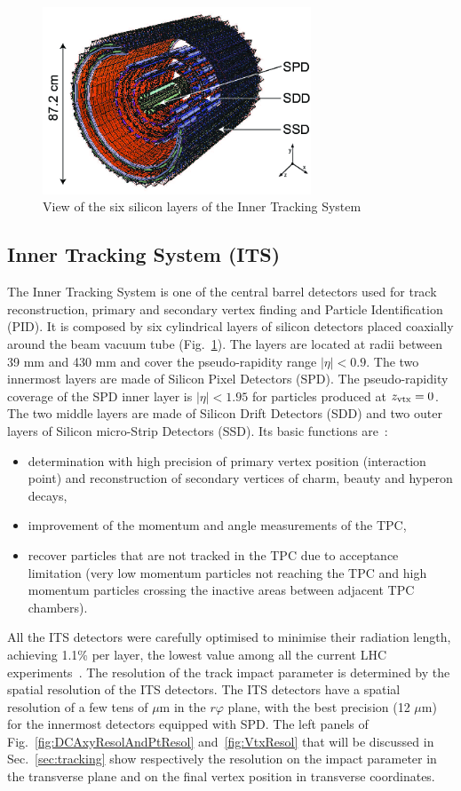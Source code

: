 \begin{figure}[!t]
\centering
\includegraphics[width=8cm]{FigCap3/figures_its-rf-2.png}
\caption{View of the six silicon layers of the Inner Tracking System}
\label{fig:image2}
\end{figure}

\subsection{Inner Tracking System (ITS)}
The Inner Tracking System is one of the central barrel detectors used for track 
reconstruction, primary and secondary vertex finding and Particle Identification (PID).
It is composed by six cylindrical layers of silicon detectors placed 
coaxially around the beam vacuum tube (Fig.~\ref{fig:image2}). The layers are located 
at radii between 39 mm and 430 mm and cover the pseudo-rapidity range 
$|\eta|<0.9$. The two innermost layers are made of Silicon Pixel Detectors (SPD). 
The pseudo-rapidity coverage of the SPD inner layer is $|\eta|<1.95$ for particles produced at $z_{\rm vtx}=0$. 
The two middle layers are made of Silicon Drift Detectors (SDD) 
and two outer layers of Silicon micro-Strip Detectors (SSD).
Its basic functions are~\cite{ITS-TDR}:
\begin{itemize}
\item determination with high precision of primary vertex position (interaction point) and reconstruction of secondary vertices 
of charm, beauty and hyperon decays,
\item improvement of the momentum and angle measurements of the TPC,
\item recover particles that are not tracked in the TPC due to acceptance limitation (very low momentum particles
not reaching the TPC and high momentum particles crossing the inactive areas between adjacent TPC chambers).
\end{itemize}
All the ITS detectors were carefully optimised to minimise their radiation 
 length, achieving 1.1\% per layer, the lowest value among all the current LHC experiments~\cite{ITS-TDR}. 
The resolution of the track impact parameter is determined by the spatial resolution of 
the ITS detectors. The ITS detectors have a spatial resolution of a few tens of 
$\mu$m in the $r\varphi$ plane, with the best precision (12  $\mu$m) for the 
innermost detectors equipped with SPD. The left panels of Fig.~\ref{fig:DCAxyResolAndPtResol} and~\ref{fig:VtxResol} that will be discussed
 in Sec.~\ref{sec:tracking} show respectively the resolution on the impact parameter
in the transverse plane and on the final vertex position in transverse coordinates. \\
 
